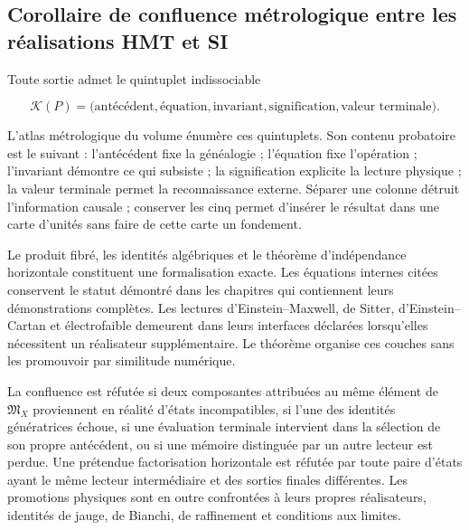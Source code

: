 \subsection{Corollaire de confluence métrologique entre les réalisations HMT et SI}

Toute sortie admet le quintuplet indissociable

\begin{equation}
 \mathcal K(P)=
 \bigl(
 \text{antécédent},
 \text{équation},
 \text{invariant},
 \text{signification},
 \text{valeur terminale}
 \bigr).
 \label{rm:eq:confluence-quintuple}
\end{equation}

L’atlas métrologique du volume énumère ces quintuplets. Son contenu probatoire est le suivant : l’antécédent fixe la généalogie ; l’équation fixe l’opération ; l’invariant démontre ce qui subsiste ; la signification explicite la lecture physique ; la valeur terminale permet la reconnaissance externe. Séparer une colonne détruit l’information causale ; conserver les cinq permet d’insérer le résultat dans une carte d’unités sans faire de cette carte un fondement.

\begin{proofstatusbox}
Le produit fibré, les identités algébriques et le théorème d’indépendance horizontale constituent une formalisation exacte. Les équations internes citées conservent le statut démontré dans les chapitres qui contiennent leurs démonstrations complètes. Les lectures d’Einstein--Maxwell, de Sitter, d’Einstein--Cartan et électrofaible demeurent dans leurs interfaces déclarées lorsqu’elles nécessitent un réalisateur supplémentaire. Le théorème organise ces couches sans les promouvoir par similitude numérique.
\end{proofstatusbox}

\begin{falsifierbox}
La confluence est réfutée si deux composantes attribuées au même élément de \(\mathfrak M_X\) proviennent en réalité d’états incompatibles, si l’une des identités génératrices échoue, si une évaluation terminale intervient dans la sélection de son propre antécédent, ou si une mémoire distinguée par un autre lecteur est perdue. Une prétendue factorisation horizontale est réfutée par toute paire d’états ayant le même lecteur intermédiaire et des sorties finales différentes. Les promotions physiques sont en outre confrontées à leurs propres réalisateurs, identités de jauge, de Bianchi, de raffinement et conditions aux limites.
\end{falsifierbox}
